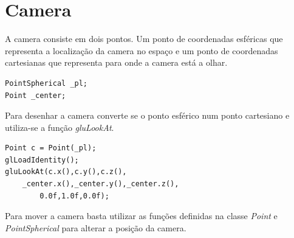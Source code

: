 \documentclass[a4paper]{report}
\begin{document}
\section{Camera}
A camera consiste em dois pontos. Um ponto de coordenadas esféricas que
representa a localização da camera no espaço e um ponto de coordenadas
cartesianas que representa para onde a camera está a olhar.\\
\begin{lstlisting}
PointSpherical _pl;
Point _center;
\end{lstlisting}
Para desenhar a camera converte se o ponto esférico num ponto cartesiano e
utiliza-se a função \textit{gluLookAt}.
\begin{lstlisting}
Point c = Point(_pl);
glLoadIdentity();
gluLookAt(c.x(),c.y(),c.z(), 
	_center.x(),_center.y(),_center.z(),
		0.0f,1.0f,0.0f);
\end{lstlisting}
Para mover a camera basta utilizar as funções definidas na classe \textit{Point}
e \textit{PointSpherical} para alterar a posição da camera.
\end{document}
